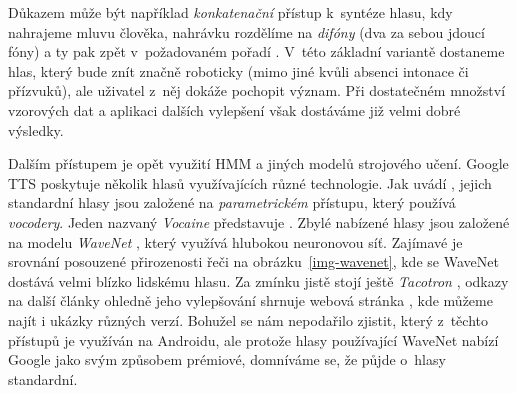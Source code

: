 Důkazem může být například
\textit{konkatenační} přístup k~syntéze hlasu, kdy nahrajeme mluvu člověka,
nahrávku rozdělíme na \textit{difóny} (dva za sebou jdoucí fóny) a ty pak
zpět  v~požadovaném pořadí \citep{OSHAUGHNESSY198855}. V~této základní variantě dostaneme
hlas, který bude znít značně roboticky (mimo jiné kvůli absenci intonace či
přízvuků), ale uživatel z~něj dokáže pochopit význam. Při dostatečném množství
vzorových dat a aplikaci dalších vylepšení však dostáváme již velmi dobré
výsledky.

Dalším přístupem je opět využití HMM a jiných modelů strojového učení.
Google TTS poskytuje několik hlasů využívajících různé technologie. Jak uvádí \citep{google_tts},
jejich standardní hlasy jsou založené na \textit{parametrickém} přístupu,
který používá \textit{vocodery}. Jeden
nazvaný \textit{Vocaine} představuje \citet{vocaine_2015}. Zbylé nabízené
hlasy jsou založené na modelu \textit{WaveNet} \citep{oord_wavenet_2016},
který využívá hlubokou neuronovou síť. Zajímavé je srovnání posouzené
přirozenosti řeči na obrázku~\ref{img-wavenet}, kde se WaveNet dostává velmi blízko
lidskému hlasu. Za zmínku jistě stojí ještě \textit{Tacotron} \citep{wang2017tacotron},
odkazy na další články ohledně jeho vylepšování shrnuje webová
stránka \citep{google_github_tacotron}, kde můžeme najít i ukázky různých verzí.
Bohužel se nám nepodařilo zjistit, který z~těchto přístupů je využíván
na Androidu, ale protože hlasy používající WaveNet nabízí Google jako svým
způsobem prémiové, domníváme se, že půjde o~hlasy standardní.

